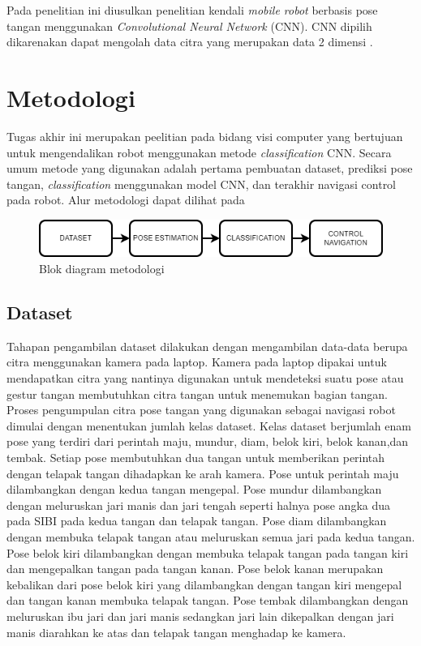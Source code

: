 \documentclass[conference]{IEEEtran}
\begin{document}
Pada penelitian ini diusulkan penelitian kendali \emph{mobile robot} berbasis pose tangan menggunakan \emph{Convolutional Neural Network} (CNN). CNN dipilih dikarenakan dapat mengolah data citra yang merupakan data 2 dimensi \cite{g7}.

\section{Metodologi}
Tugas akhir ini merupakan peelitian pada bidang visi computer yang bertujuan untuk mengendalikan robot menggunakan metode \emph{classification} CNN. Secara umum metode yang digunakan adalah pertama pembuatan dataset, prediksi pose tangan, \emph{classification} menggunakan model CNN, dan terakhir navigasi control pada robot. Alur metodologi dapat dilihat pada

\begin{figure}[!h]
    \centering
      \includegraphics[width=1\linewidth]{../Gambar/metodologi.png}
      \caption{Blok diagram metodologi}
      \label{fig:metodologi}
  \end{figure}

\subsection{Dataset}

Tahapan pengambilan dataset dilakukan dengan mengambilan data-data berupa citra menggunakan kamera pada laptop. Kamera pada laptop dipakai untuk mendapatkan citra yang nantinya digunakan untuk mendeteksi suatu pose atau gestur tangan membutuhkan citra tangan untuk menemukan bagian tangan. Proses pengumpulan citra pose tangan yang digunakan sebagai navigasi robot  dimulai dengan menentukan jumlah kelas dataset. Kelas dataset berjumlah enam pose yang terdiri dari perintah maju, mundur, diam, belok kiri, belok kanan,dan tembak. Setiap pose membutuhkan dua tangan untuk memberikan perintah dengan telapak tangan dihadapkan ke arah kamera. Pose untuk perintah maju dilambangkan dengan kedua tangan mengepal. Pose mundur dilambangkan dengan meluruskan jari manis dan jari tengah seperti halnya pose angka dua pada SIBI pada kedua tangan dan telapak tangan.  Pose diam dilambangkan dengan membuka telapak tangan atau meluruskan semua jari pada kedua tangan.  Pose belok kiri dilambangkan dengan membuka telapak tangan pada tangan kiri dan mengepalkan tangan pada tangan kanan. Pose belok kanan merupakan kebalikan dari pose belok kiri yang dilambangkan dengan tangan kiri mengepal dan tangan kanan membuka telapak tangan. Pose tembak dilambangkan dengan meluruskan ibu jari dan jari manis sedangkan jari lain dikepalkan dengan jari manis diarahkan ke atas dan telapak tangan menghadap ke kamera.
\end{document}
